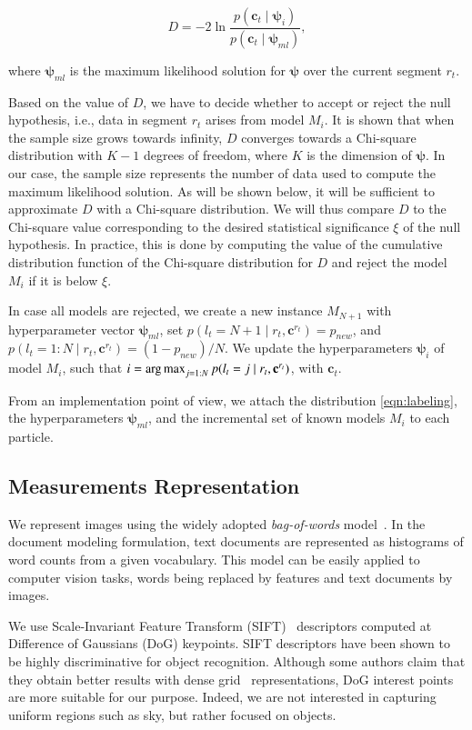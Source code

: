 \begin{equation}
\label{eqn:statistic}
D = -2\ln\frac{p(\mathbf{c}_t\mid \boldsymbol{\psi}_i)}{p(\mathbf{c}_t\mid
\boldsymbol{\psi}_{ml})},
\end{equation}

where $\boldsymbol{\psi}_{ml}$ is the maximum likelihood solution for
$\boldsymbol{\psi}$ over the current segment $r_t$.

Based on the value of $D$, we have to decide whether to accept or reject the
null hypothesis, i.e., data in segment $r_t$ arises from model $M_i$. It is
shown that when the sample size grows towards infinity, $D$ converges towards a
Chi-square distribution with $K-1$ degrees of freedom, where $K$ is the
dimension of $\boldsymbol{\psi}$. In our case, the sample size represents the
number of data used to compute the maximum likelihood solution. As will be
shown below, it will be sufficient to approximate $D$ with a Chi-square
distribution. We will thus compare $D$ to the Chi-square value corresponding to
the desired statistical significance $\xi$ of the null hypothesis. In practice,
this is done by computing the value of the cumulative distribution
function of the Chi-square distribution for $D$ and reject the model
$M_i$ if it is below $\xi$.

In case all models are rejected, we create a new instance $M_{N+1}$
with hyperparameter vector $\boldsymbol{\psi}_{ml}$, set $p(l_t=N+1\mid r_t,
\mathbf{c}^{r_t})=p_{new}$, and $p(l_t=1:N\mid r_t,\mathbf{c}^{r_t})=
(1-p_{new})/N$. We update the hyperparameters $\boldsymbol{\psi}_i$ of model
$M_i$, such that $i=\operatorname*{arg\,max}_{j=1:N}p(l_t=j\mid
r_t,\mathbf{c}^{r_t})$, with $\mathbf{c}_t$.

From an implementation point of view, we attach the distribution
\eqref{eqn:labeling}, the hyperparameters $\boldsymbol{\psi}_{ml}$, and the
incremental set of known models $M_i$ to each particle.

\subsection{Measurements Representation}
We represent images using the widely adopted \emph{bag-of-words}
model~\cite{sivic03video}. In the document modeling formulation, text documents
are represented as histograms of word counts from a given vocabulary. This model
can be easily applied to computer vision tasks, words being replaced by features
and text documents by images.

We use Scale-Invariant Feature Transform (SIFT)~\cite{lowe04distinctive}
descriptors computed at Difference of Gaussians (DoG) keypoints. SIFT
descriptors have been shown to be highly discriminative for object recognition.
Although some authors claim that they obtain better results with dense
grid~\cite{feifei05bayesian} representations, DoG interest points are more
suitable for our purpose. Indeed, we are not interested in capturing uniform
regions such as sky, but rather focused on objects.

